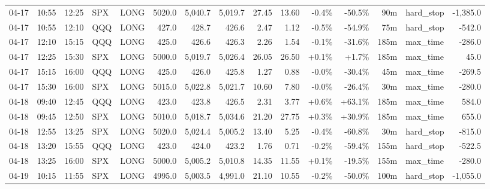 \documentclass[11pt,a4paper,twoside]{article}
\begin{document}
\begin{landscape}
\begin{center}
\begin{longtable}{>{\color{txtmain}}l l l l l r r r r r r r r >{\color{txtmain}}l r}
04-17 & 10:55 & 12:25 & SPX & LONG & 5020.0 & 5,040.7 & 5,019.7 & 27.45 & 13.60 & \textcolor{lossred}{-0.4\%} & \textcolor{lossred}{-50.5\%} & 90m & hard\_stop & \textcolor{lossred}{-1,385.0} \\
04-17 & 10:55 & 12:10 & QQQ & LONG & 427.0 & 428.7 & 426.6 & 2.47 & 1.12 & \textcolor{lossred}{-0.5\%} & \textcolor{lossred}{-54.9\%} & 75m & hard\_stop & \textcolor{lossred}{-542.0} \\
04-17 & 12:10 & 15:15 & QQQ & LONG & 425.0 & 426.6 & 426.3 & 2.26 & 1.54 & \textcolor{lossred}{-0.1\%} & \textcolor{lossred}{-31.6\%} & 185m & max\_time & \textcolor{lossred}{-286.0} \\
04-17 & 12:25 & 15:30 & SPX & LONG & 5000.0 & 5,019.7 & 5,026.4 & 26.05 & 26.50 & \textcolor{wingreen}{+0.1\%} & \textcolor{wingreen}{+1.7\%} & 185m & max\_time & \textcolor{wingreen}{45.0} \\
04-17 & 15:15 & 16:00 & QQQ & LONG & 425.0 & 426.0 & 425.8 & 1.27 & 0.88 & \textcolor{lossred}{-0.0\%} & \textcolor{lossred}{-30.4\%} & 45m & max\_time & \textcolor{lossred}{-269.5} \\
04-17 & 15:30 & 16:00 & SPX & LONG & 5015.0 & 5,022.8 & 5,021.7 & 10.60 & 7.80 & \textcolor{lossred}{-0.0\%} & \textcolor{lossred}{-26.4\%} & 30m & max\_time & \textcolor{lossred}{-280.0} \\
04-18 & 09:40 & 12:45 & QQQ & LONG & 423.0 & 423.8 & 426.5 & 2.31 & 3.77 & \textcolor{wingreen}{+0.6\%} & \textcolor{wingreen}{+63.1\%} & 185m & max\_time & \textcolor{wingreen}{584.0} \\
04-18 & 09:45 & 12:50 & SPX & LONG & 5010.0 & 5,018.7 & 5,034.6 & 21.20 & 27.75 & \textcolor{wingreen}{+0.3\%} & \textcolor{wingreen}{+30.9\%} & 185m & max\_time & \textcolor{wingreen}{655.0} \\
04-18 & 12:55 & 13:25 & SPX & LONG & 5020.0 & 5,024.4 & 5,005.2 & 13.40 & 5.25 & \textcolor{lossred}{-0.4\%} & \textcolor{lossred}{-60.8\%} & 30m & hard\_stop & \textcolor{lossred}{-815.0} \\
04-18 & 13:20 & 15:55 & QQQ & LONG & 423.0 & 424.0 & 423.2 & 1.76 & 0.71 & \textcolor{lossred}{-0.2\%} & \textcolor{lossred}{-59.4\%} & 155m & hard\_stop & \textcolor{lossred}{-522.5} \\
04-18 & 13:25 & 16:00 & SPX & LONG & 5000.0 & 5,005.2 & 5,010.8 & 14.35 & 11.55 & \textcolor{wingreen}{+0.1\%} & \textcolor{lossred}{-19.5\%} & 155m & max\_time & \textcolor{lossred}{-280.0} \\
04-19 & 10:15 & 11:55 & SPX & LONG & 4995.0 & 5,003.5 & 4,991.0 & 21.10 & 10.55 & \textcolor{lossred}{-0.2\%} & \textcolor{lossred}{-50.0\%} & 100m & hard\_stop & \textcolor{lossred}{-1,055.0} \\

\end{longtable}
\end{center}
\end{landscape}
\end{document}
